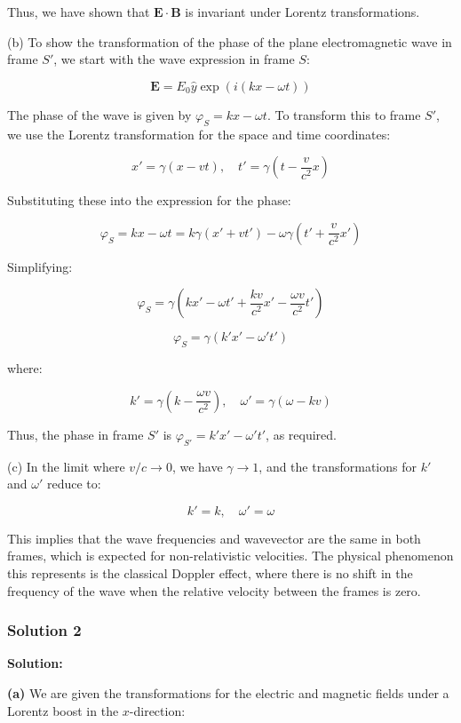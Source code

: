 \documentclass{article}
\begin{document}
Thus, we have shown that \( \mathbf{E} \cdot \mathbf{B} \) is invariant under Lorentz transformations.

(b) To show the transformation of the phase of the plane electromagnetic wave in frame \( S' \), we start with the wave expression in frame \( S \):

\[
\mathbf{E} = E_0 \hat{y} \exp \left( i(kx - \omega t) \right)
\]

The phase of the wave is given by \( \varphi_S = kx - \omega t \). To transform this to frame \( S' \), we use the Lorentz transformation for the space and time coordinates:

\[
x' = \gamma (x - vt), \quad t' = \gamma \left( t - \frac{v}{c^2} x \right)
\]

Substituting these into the expression for the phase:

\[
\varphi_S = kx - \omega t = k \gamma (x' + vt') - \omega \gamma \left( t' + \frac{v}{c^2} x' \right)
\]

Simplifying:

\[
\varphi_S = \gamma \left( kx' - \omega t' + \frac{kv}{c^2} x' - \frac{\omega v}{c^2} t' \right)
\]

\[
\varphi_S = \gamma \left( k' x' - \omega' t' \right)
\]

where:

\[
k' = \gamma \left( k - \frac{\omega v}{c^2} \right), \quad \omega' = \gamma (\omega - kv)
\]

Thus, the phase in frame \( S' \) is \( \varphi_{S'} = k'x' - \omega' t' \), as required.

(c) In the limit where \( v / c \to 0 \), we have \( \gamma \to 1 \), and the transformations for \( k' \) and \( \omega' \) reduce to:

\[
k' = k, \quad \omega' = \omega
\]

This implies that the wave frequencies and wavevector are the same in both frames, which is expected for non-relativistic velocities. The physical phenomenon this represents is the classical Doppler effect, where there is no shift in the frequency of the wave when the relative velocity between the frames is zero.


\subsubsection{Solution 2}
\textbf{Solution:}

\textbf{(a)} We are given the transformations for the electric and magnetic fields under a Lorentz boost in the \( x \)-direction:
\end{document}

